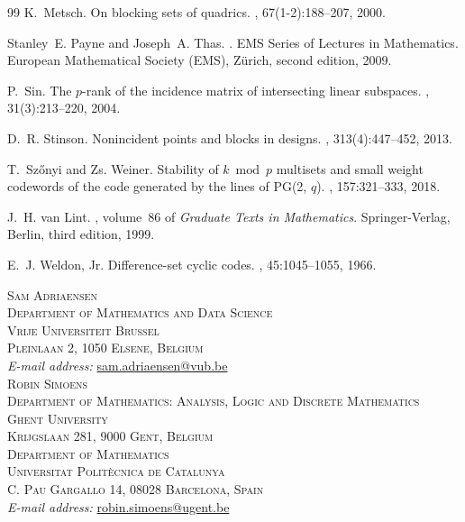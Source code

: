 \documentclass[a4paper]{article}
\theoremstyle{definition}
\begin{document}
\begin{thebibliography}{99}
K.~Metsch.
\newblock On blocking sets of quadrics.
, 67(1-2):188--207, 2000.

Stanley~E. Payne and Joseph~A. Thas.
.
\newblock EMS Series of Lectures in Mathematics. European Mathematical Society
  (EMS), Z\"{u}rich, second edition, 2009.

P.~Sin.
\newblock The {$p$}-rank of the incidence matrix of intersecting linear
  subspaces.
, 31(3):213--220, 2004.

D.~R. Stinson.
\newblock Nonincident points and blocks in designs.
, 313(4):447--452, 2013.

T.~Sz\H{o}nyi and {Zs}. Weiner.
\newblock Stability of {$k\bmod p$} multisets and small weight codewords of the
  code generated by the lines of {PG}(2, {$q$}).
, 157:321--333, 2018.

J.~H. van Lint.
, volume~86 of {\em Graduate Texts
  in Mathematics}.
\newblock Springer-Verlag, Berlin, third edition, 1999.

E.~J. Weldon, Jr.
\newblock Difference-set cyclic codes.
, 45:1045--1055, 1966.

\end{thebibliography}


\vfill
\noindent\textsc{Sam Adriaensen}\\
\textsc{\small Department of Mathematics and Data Science}\\[-1mm]
\textsc{\small Vrije Universiteit Brussel}\\[-1mm]
\textsc{\small Pleinlaan 2, 1050 Elsene, Belgium}\\
{\it E-mail address:} {\href{mailto:sam.adriaensen@vub.be}{\url{sam.adriaensen@vub.be}}}\\

\noindent\textsc{Robin Simoens}\\
\textsc{\small Department of Mathematics: Analysis, Logic and Discrete Mathematics}\\[-1mm]
\textsc{\small Ghent University}\\[-1mm]
\textsc{\small Krijgslaan 281, 9000 Gent, Belgium}\\
\textsc{\small Department of Mathematics}\\[-1mm]
\textsc{\small Universitat Politècnica de Catalunya}\\[-1mm]
\textsc{\small C. Pau Gargallo 14, 08028 Barcelona, Spain}\\
{\it E-mail address:} {\href{mailto:robin.simoens@ugent.be}{\url{robin.simoens@ugent.be}}}\\
\end{document}
